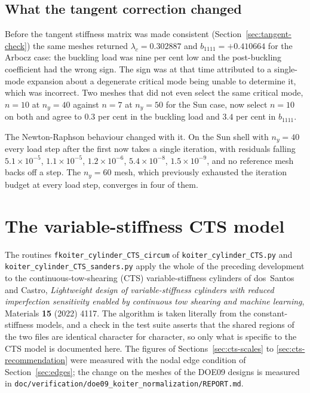 \documentclass[11pt,a4paper]{article}
\begin{document}
\subsection{What the tangent correction changed}

Before the tangent stiffness matrix was made consistent
(Section~\ref{sec:tangent-check}) the same meshes returned $\lambda_c =
0.302887$ and $b_{1111} = +0.410664$ for the Arbocz case: the buckling load
was nine per cent low and the post-buckling coefficient had the wrong sign.
The sign was at that time attributed to a single-mode expansion about a
degenerate critical mode being unable to determine it, which was incorrect.
Two meshes that did not even select the same critical mode, $n = 10$ at
$n_y = 40$ against $n = 7$ at $n_y = 50$ for the Sun case, now
select $n = 10$ on both and agree to $0.3$ per cent in the buckling load and
$3.4$ per cent in $b_{1111}$.

The Newton-Raphson behaviour changed with it.  On the Sun shell with
$n_y = 40$ every load step after the first now takes a single iteration, with
residuals falling $5.1\times10^{-5}$, $1.1\times10^{-5}$, $1.2\times10^{-6}$,
$5.4\times10^{-8}$, $1.5\times10^{-9}$, and no reference mesh backs off a
step.  The $n_y = 60$ mesh,
which previously exhausted the iteration budget at every load step, converges
in four of them.

\section{The variable-stiffness CTS model}
\label{sec:cts}

The routines \texttt{fkoiter\_cylinder\_CTS\_circum} of
\texttt{koiter\_cylinder\_CTS.py} and \texttt{koiter\_cylinder\_CTS\_sanders.py}
apply the whole of the preceding development to the continuous-tow-shearing
(CTS) variable-stiffness cylinders of dos~Santos and Castro,
\emph{Lightweight design of variable-stiffness cylinders with reduced
imperfection sensitivity enabled by continuous tow shearing and machine
learning}, Materials \textbf{15} (2022) 4117.  The algorithm is taken
literally from the constant-stiffness models, and a check in the test suite
asserts that the shared regions of the two files are identical character for
character, so only what is specific to the CTS model is documented here.  The
figures of Sections~\ref{sec:cts-scales} to \ref{sec:cts-recommendation}
were measured with the nodal edge condition of Section~\ref{sec:edges}; the
change on the meshes of the DOE09 designs is measured in
\texttt{doc/verification/doe09\_koiter\_normalization/REPORT.md}.
\end{document}
